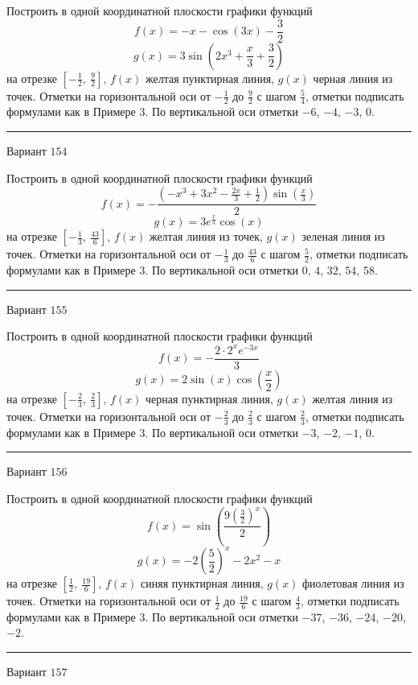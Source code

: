 \documentclass[11pt]{report}
\begin{document}
Построить в одной координатной плоскости графики функций $$f(x) = - x - \cos{\left(3 x \right)} - \frac{3}{2}$$ $$g(x) = 3 \sin{\left(2 x^{3} + \frac{x}{3} + \frac{3}{2} \right)}$$ на отрезке $\left[- \frac{1}{2}, \  \frac{9}{2}\right]$, $f(x)$ желтая пунктирная линия, $g(x)$ черная линия из точек. Отметки на горизонтальной оси от $- \frac{1}{2}$ до $\frac{9}{2}$ с шагом $\frac{5}{4}$, отметки подписать формулами как в Примере 3. По вертикальной оси отметки $-6$, $-4$, $-3$, $0$.
\begin{center}
\noindent\rule{8cm}{0.4pt}
\end{center}
Вариант $154$


Построить в одной координатной плоскости графики функций $$f(x) = - \frac{\left(- x^{3} + 3 x^{2} - \frac{2 x}{3} + \frac{1}{2}\right) \sin{\left(\frac{x}{3} \right)}}{2}$$ $$g(x) = 3 e^{\frac{x}{3}} \cos{\left(x \right)}$$ на отрезке $\left[- \frac{1}{3}, \  \frac{43}{6}\right]$, $f(x)$ желтая линия из точек, $g(x)$ зеленая линия из точек. Отметки на горизонтальной оси от $- \frac{1}{3}$ до $\frac{43}{6}$ с шагом $\frac{5}{2}$, отметки подписать формулами как в Примере 3. По вертикальной оси отметки $0$, $4$, $32$, $54$, $58$.
\begin{center}
\noindent\rule{8cm}{0.4pt}
\end{center}
Вариант $155$


Построить в одной координатной плоскости графики функций $$f(x) = - \frac{2 \cdot 2^{x} e^{- 3 x}}{3}$$ $$g(x) = 2 \sin{\left(x \right)} \cos{\left(\frac{x}{2} \right)}$$ на отрезке $\left[- \frac{2}{3}, \  \frac{2}{3}\right]$, $f(x)$ черная пунктирная линия, $g(x)$ желтая линия из точек. Отметки на горизонтальной оси от $- \frac{2}{3}$ до $\frac{2}{3}$ с шагом $\frac{2}{3}$, отметки подписать формулами как в Примере 3. По вертикальной оси отметки $-3$, $-2$, $-1$, $0$.
\begin{center}
\noindent\rule{8cm}{0.4pt}
\end{center}
Вариант $156$


Построить в одной координатной плоскости графики функций $$f(x) = \sin{\left(\frac{9 \left(\frac{3}{2}\right)^{x}}{2} \right)}$$ $$g(x) = - 2 \left(\frac{5}{2}\right)^{x} - 2 x^{2} - x$$ на отрезке $\left[\frac{1}{2}, \  \frac{19}{6}\right]$, $f(x)$ синяя пунктирная линия, $g(x)$ фиолетовая линия из точек. Отметки на горизонтальной оси от $\frac{1}{2}$ до $\frac{19}{6}$ с шагом $\frac{4}{3}$, отметки подписать формулами как в Примере 3. По вертикальной оси отметки $-37$, $-36$, $-24$, $-20$, $-2$.
\begin{center}
\noindent\rule{8cm}{0.4pt}
\end{center}
Вариант $157$
\end{document}
